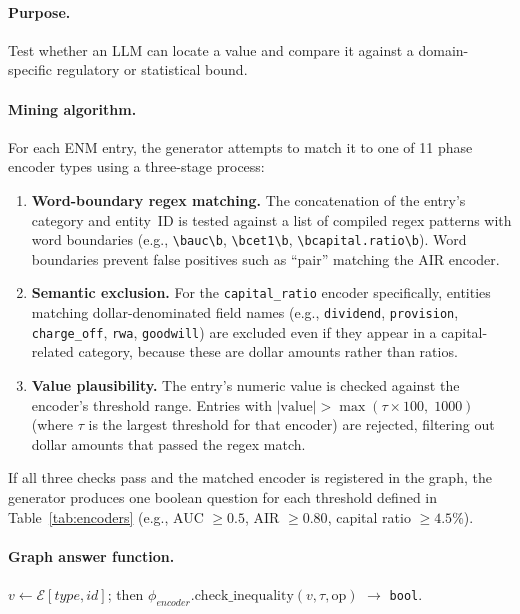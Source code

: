\documentclass[11pt]{article}
\begin{document}
\paragraph{Purpose.}  Test whether an LLM can locate a value and compare
it against a domain-specific regulatory or statistical bound.

\paragraph{Mining algorithm.}
For each ENM entry, the generator attempts to match it to one of 11 phase
encoder types using a three-stage process:

\begin{enumerate}[leftmargin=2em]
  \item \textbf{Word-boundary regex matching.}  The concatenation of the
    entry's category and entity~ID is tested against a list of compiled
    regex patterns with word boundaries (e.g., \texttt{\textbackslash bauc\textbackslash b},
    \texttt{\textbackslash bcet1\textbackslash b},
    \texttt{\textbackslash bcapital.ratio\textbackslash b}).  Word boundaries
    prevent false positives such as ``pair'' matching the AIR encoder.
  \item \textbf{Semantic exclusion.}  For the \texttt{capital\_ratio} encoder
    specifically, entities matching dollar-denominated field names
    (e.g., \texttt{dividend}, \texttt{provision}, \texttt{charge\_off},
    \texttt{rwa}, \texttt{goodwill}) are excluded even if they appear in a
    capital-related category, because these are dollar amounts rather than
    ratios.
  \item \textbf{Value plausibility.}  The entry's numeric value is checked
    against the encoder's threshold range.  Entries with
    $|\text{value}| > \max(\tau \times 100,\; 1000)$ (where $\tau$ is the
    largest threshold for that encoder) are rejected, filtering out dollar
    amounts that passed the regex match.
\end{enumerate}

\noindent
If all three checks pass and the matched encoder is registered in the
graph, the generator produces one boolean question for each threshold
defined in Table~\ref{tab:encoders} (e.g., AUC $\geq 0.5$,
AIR $\geq 0.80$, capital ratio $\geq 4.5$\%).

\paragraph{Graph answer function.}
$v \gets \mathcal{E}[\textit{type}, \textit{id}]$; then
$\phi_{\textit{encoder}}.\text{check\_inequality}(v, \tau, \text{op})$
$\to$ \texttt{bool}.
\end{document}
